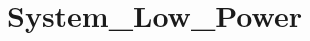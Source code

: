 \hypertarget{group___system___low___power}{\section{System\-\_\-\-Low\-\_\-\-Power}
\label{group___system___low___power}
}
